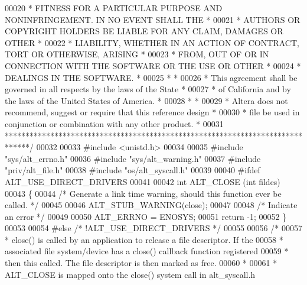 \begin{DoxyCode}
00020 \textcolor{comment}{* FITNESS FOR A PARTICULAR PURPOSE AND NONINFRINGEMENT. IN NO EVENT SHALL THE *}
00021 \textcolor{comment}{* AUTHORS OR COPYRIGHT HOLDERS BE LIABLE FOR ANY CLAIM, DAMAGES OR OTHER      *}
00022 \textcolor{comment}{* LIABILITY, WHETHER IN AN ACTION OF CONTRACT, TORT OR OTHERWISE, ARISING     *}
00023 \textcolor{comment}{* FROM, OUT OF OR IN CONNECTION WITH THE SOFTWARE OR THE USE OR OTHER         *}
00024 \textcolor{comment}{* DEALINGS IN THE SOFTWARE.                                                   *}
00025 \textcolor{comment}{*                                                                             *}
00026 \textcolor{comment}{* This agreement shall be governed in all respects by the laws of the State   *}
00027 \textcolor{comment}{* of California and by the laws of the United States of America.              *}
00028 \textcolor{comment}{*                                                                             *}
00029 \textcolor{comment}{* Altera does not recommend, suggest or require that this reference design    *}
00030 \textcolor{comment}{* file be used in conjunction or combination with any other product.          *}
00031 \textcolor{comment}{******************************************************************************/}
00032 
00033 \textcolor{preprocessor}{#include <unistd.h>}
00034 
00035 \textcolor{preprocessor}{#include "sys/alt_errno.h"}
00036 \textcolor{preprocessor}{#include "sys/alt_warning.h"}
00037 \textcolor{preprocessor}{#include "priv/alt_file.h"}
00038 \textcolor{preprocessor}{#include "os/alt_syscall.h"}
00039 
00040 \textcolor{preprocessor}{#ifdef ALT\_USE\_DIRECT\_DRIVERS}
00041 
00042 \textcolor{keywordtype}{int} ALT_CLOSE (\textcolor{keywordtype}{int} fildes)
00043 \{
00044   \textcolor{comment}{/* Generate a link time warning, should this function ever be called. */}
00045   
00046   ALT_STUB_WARNING(close);
00047   
00048   \textcolor{comment}{/* Indicate an error */}
00049   
00050   ALT_ERRNO = ENOSYS;
00051   \textcolor{keywordflow}{return} -1;
00052 \}
00053 
00054 \textcolor{preprocessor}{#else }\textcolor{comment}{/* !ALT\_USE\_DIRECT\_DRIVERS */}\textcolor{preprocessor}{}
00055 
00056 \textcolor{comment}{/*}
00057 \textcolor{comment}{ * close() is called by an application to release a file descriptor. If the}
00058 \textcolor{comment}{ * associated file system/device has a close() callback function registered }
00059 \textcolor{comment}{ * then this called. The file descriptor is then marked as free.}
00060 \textcolor{comment}{ *}
00061 \textcolor{comment}{ * ALT\_CLOSE is mapped onto the close() system call in alt\_syscall.h}

\end{DoxyCode}
